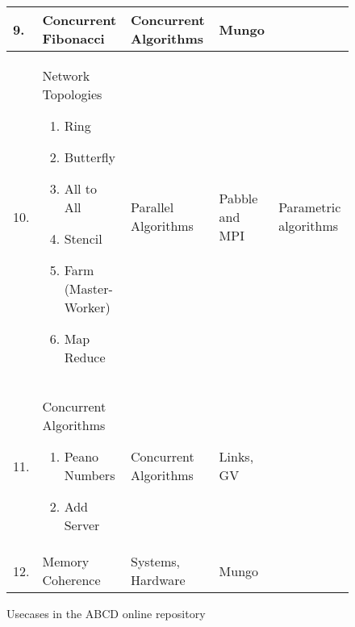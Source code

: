 \begin{figure}
\begin{longtable}{|l|p{3.2cm}|p{3cm}|p{2.5cm}|p{2.7cm}|}
		\hline
		9.	&	Concurrent Fibonacci
						&	Concurrent Algorithms		&	Mungo					&
		\\
		\hline
		10.	&	Network Topologies
				\begin{enumerate}[label=$\bullet$]
					\item	Ring
					\item	Butterfly
					\item	All to All
					\item	Stencil
					\item	Farm (Master-Worker)
					\item	Map Reduce
				\end{enumerate}
						&	Parallel Algorithms		&	Pabble and MPI				&	Parametric algorithms
		\\
		\hline
		11.	&	Concurrent Algorithms
				\begin{enumerate}[label=$\bullet$]
					\item	Peano Numbers
					\item	Add Server
				\end{enumerate}
						&	Concurrent Algorithms	&	Links, GV					&
		\\
		\hline
		12.	&	Memory Coherence
						&	Systems, Hardware		&	Mungo						&	
		\\
		\hline
	\end{longtable}
	\caption{Usecases in the ABCD online repository}
\end{figure}
